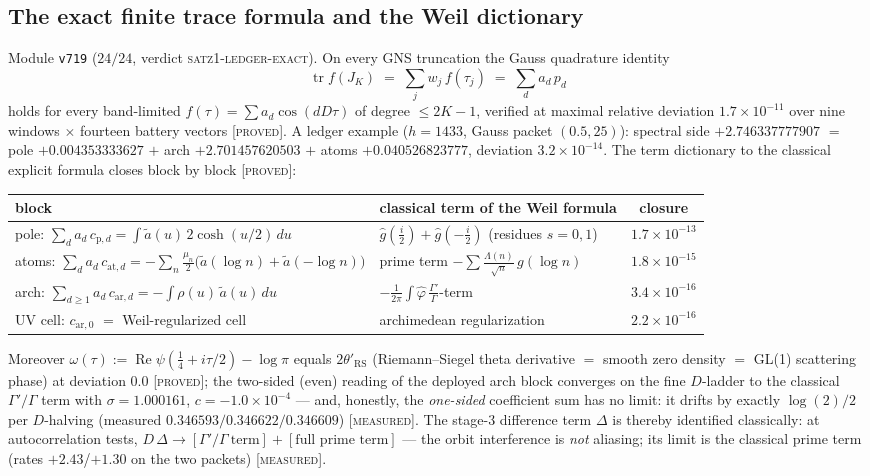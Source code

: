 \documentclass[11pt,a4paper]{article}
\theoremstyle{remark}
\DeclareMathOperator{\Rey}{Re}
\DeclareMathOperator{\tr}{tr}
\newcommand{\PROVED}{\textnormal{[\textsc{proved}]}}
\newcommand{\MEASURED}{\textnormal{[\textsc{measured}]}}
\begin{document}
\subsection{The exact finite trace formula and the Weil
dictionary}\label{sec:trace}

Module \texttt{v719} ($24/24$, verdict
\textsc{satz1-ledger-exact}).  On every GNS truncation the Gauss
quadrature identity
\[
\tr f(J_K)\;=\;\sum_{j} w_j\,f(\tau_j)\;=\;\sum_{d} a_d\,p_d
\]
holds for every band-limited $f(\tau)=\sum a_d\cos(dD\tau)$ of
degree $\le2K-1$, verified at maximal relative deviation
$1.7\times10^{-11}$ over nine windows $\times$ fourteen battery
vectors \PROVED.  A ledger example ($h=1433$, Gauss packet
$(0.5,25)$): spectral side $+2.746337777907$ $=$ pole
$+0.004353333627$ $+$ arch $+2.701457620503$ $+$ atoms
$+0.040526823777$, deviation $3.2\times10^{-14}$.  The term
dictionary to the classical explicit formula \cite{Weil52} closes
block by block \PROVED:
\begin{center}
\footnotesize
\setlength{\tabcolsep}{4pt}
\begin{tabular}{@{}llc@{}}
\toprule
block & classical term of the Weil formula & closure\\
\midrule
pole: $\sum_d a_d\,c_{\mathrm p,d}=\int \tilde a(u)\,2\cosh(u/2)\,du$
& $\hat g(\tfrac i2)+\hat g(-\tfrac i2)$ (residues $s=0,1$)
& $1.7\times10^{-13}$\\
atoms: $\sum_d a_d\,c_{\mathrm{at},d}
=-\sum_n\tfrac{\mu_n}{2}\bigl(\tilde a(\log n)+\tilde a(-\log n)\bigr)$
& prime term $-\sum\frac{\Lambda(n)}{\sqrt n}\,g(\log n)$
& $1.8\times10^{-15}$\\
arch: $\sum_{d\ge1} a_d\,c_{\mathrm{ar},d}=-\int\rho(u)\,\tilde a(u)\,du$
& $-\frac{1}{2\pi}\int\hat\varphi\,\frac{\Gamma'}{\Gamma}$-term
& $3.4\times10^{-16}$\\
UV cell: $c_{\mathrm{ar},0}$ $=$ Weil-regularized cell
& archimedean regularization & $2.2\times10^{-16}$\\
\bottomrule
\end{tabular}
\end{center}
Moreover $\omega(\tau):=\Rey\psi(\tfrac14+i\tau/2)-\log\pi$ equals
$2\theta'_{\mathrm{RS}}$ (Riemann--Siegel theta derivative $=$ smooth
zero density $=$ GL(1) scattering phase) at deviation $0.0$
\PROVED; the two-sided (even) reading of the deployed arch block
converges on the fine $D$-ladder to the classical
$\Gamma'/\Gamma$ term with $\sigma=1.000161$, $c=-1.0\times10^{-4}$
--- and, honestly, the \emph{one-sided} coefficient sum has no limit:
it drifts by exactly $\log(2)/2$ per $D$-halving (measured
$0.346593/0.346622/0.346609$) \MEASURED.  The stage-3 difference
term $\Delta$ is thereby identified classically: at autocorrelation
tests, $D\,\Delta\to[\Gamma'/\Gamma\ \text{term}]+[\text{full prime
term}]$ --- the orbit interference is \emph{not} aliasing; its limit
is the classical prime term (rates $+2.43$/$+1.30$ on the two
packets) \MEASURED.
\end{document}
